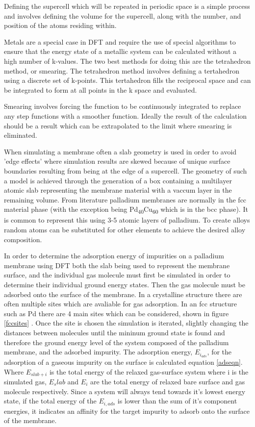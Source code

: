 Defining the supercell which will be repeated in periodic space is a simple process and involves defining the volume for the supercell, along with the number, and position of the atoms residing within. 

Metals are a special case in DFT and require the use of special algorithms to ensure that the energy state of a metallic system can be calculated without a high number of k-values. The two best methods for doing this are the tetrahedron method, or smearing. The tetrahedron method involves defining a tertahedron using a discrete set of k-points. This tertahedron fills the reciprocal space and can be integrated to form at all points in the k space and evaluated. \cite{doi:10.1002/9780470447710.ch2}

Smearing involves forcing the function to be continuously integrated to replace any step functions with a smoother function. Ideally the result of the calculation should be a result which can be extrapolated to the limit where smearing is eliminated. \cite{doi:10.1002/9780470447710.ch2}

When simulating a membrane often a slab geometry is used in order to avoid 'edge effects' where simulation results are skewed because of unique surface boundaries resulting from being at the edge of a supercell. The geometry of such a model is achieved through the generation of a box containing a multilayer atomic slab representing the membrane material with a vaccum layer in the remaining volume. From literature palladium membranes are normally in the fcc material phase \cite{Alique_2018} (with the exception being Pd\textsubscript{40}Cu\textsubscript{60} which is in the bcc phase). It is common to represent this using 3-5 atomic layers of palladium. To create alloys random atoms can be substituted for other elements to achieve the desired alloy composition. 

In order to determine the adsorption energy of impurities on a palladium membrane using DFT both the slab being used to represent the membrane surface, and the individual gas molecule must first be simulated in order to determine their individual ground energy states. Then the gas molecule must be adsorbed onto the surface of the membrane. In a crystalline structure there are often multiple sites which are avaliable for gas adsorption. In an fcc structure such as Pd there are 4 main sites which can be considered, shown in figure \ref{fccsites} \cite{Zeng2009}. Once the site is chosen the simulation is iterated, slightly changing the distances between molecules until the mininum ground state is found and therefore the ground energy level of the system composed of the palladium membrane, and the adsorbed impurity. The adsorption energy, $E_{i_{ads}}$, for the adsorption of a gaseous impurity on the surface is calculated equation \ref{adseqn}. Where $E_{slab + i}$ is the total energy of the relaxed gas-surface system where i is the simulated gas, $E_slab$ and $E_i$ are the total energy of relaxed bare surface and gas molecule respectively. Since a system will always tend towards it's lowest energy state, if the total energy of the $E_{i,ads}$ is lower than the sum of it's component energies, it indicates an affinity for the target impurity to adsorb onto the surface of the membrane.

